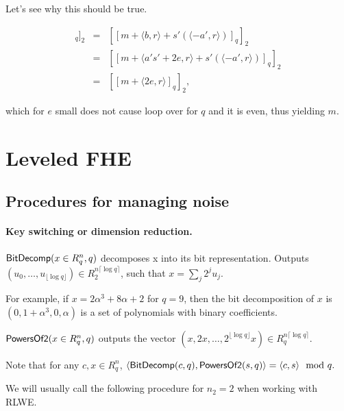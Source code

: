 \documentclass[11pt]{article}
\begin{document}

Let's see why this should be true.

\begin{eqnarray*}
[[\langle c, s \rangle]_q]_2 &=& [[m + \langle b, r \rangle + s'(\langle -a', r \rangle) ]_q]_2 \\
&=& [[m + \langle a's'+2e, r \rangle + s'(\langle -a', r \rangle) ]_q]_2  \\
&=& [[m + \langle 2e, r \rangle ]_q]_2,
\end{eqnarray*}

which for $e$ small does not cause loop over for $q$ and it is even, thus yielding $m$. 


\section{Leveled FHE}


\subsection{Procedures for managing noise}

\paragraph{Key switching or dimension reduction.}
$\mathsf{BitDecomp}(x \in R^n_q, q)$ decomposes x into its bit representation. Outputs $(u_0, \dots, u_{\lfloor \log q \rfloor}) \in R_2^{n\lceil \log q \rceil }$, such that $x = \sum_j 2^j u_j$. 

For example, if $x = 2 \alpha^3 + 8 \alpha + 2$ for $q = 9$, then the bit decomposition of $x$ is $(0, 1+\alpha^3, 0, \alpha)$ is a set of polynomials with binary coefficients. 

$\mathsf{PowersOf2}(x \in R^n_q, q)$ outputs the vector $(x, 2x, \dots, 2^{\lfloor \log q \rfloor} x) \in R_q^{n \lceil \log q \rceil }$.

Note that for any $c, x \in R^n_q$, $\langle \mathsf{BitDecomp}(c, q), \mathsf{PowersOf2}(s, q)\rangle = \langle c, s \rangle \mod q. $

We will usually call the following procedure for $n_2 =2$ when working with RLWE.

\end{document}
